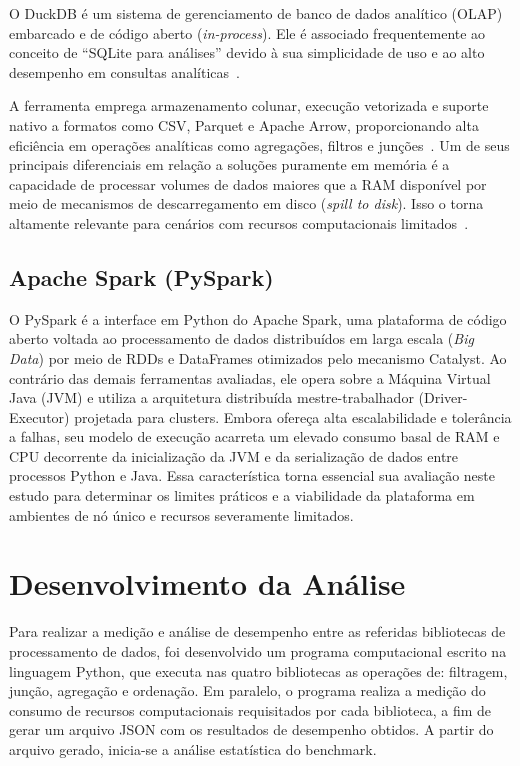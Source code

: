 \documentclass[12pt]{article}
\begin{document}
O DuckDB é um sistema de gerenciamento de banco de dados analítico (OLAP) embarcado e de código
aberto (\textit{in-process}). Ele é associado frequentemente ao conceito de ``SQLite para análises''
devido à sua simplicidade de uso e ao alto desempenho em consultas analíticas~\cite{duckdb:2026a,
duckdb:2026b}.

A ferramenta emprega armazenamento colunar, execução vetorizada e suporte nativo a formatos como
CSV, Parquet e Apache Arrow, proporcionando alta eficiência em operações analíticas como agregações,
filtros e junções~\cite{duckdb:ai2026}. Um de seus principais diferenciais em relação a soluções
puramente em memória é a capacidade de processar volumes de dados maiores que a RAM disponível por
meio de mecanismos de descarregamento em disco (\textit{spill to disk}). Isso o torna altamente
relevante para cenários com recursos computacionais limitados~\cite{duckdb:2026a}.


\subsection{Apache Spark (PySpark)}

O PySpark é a interface em Python do Apache Spark, uma plataforma de código aberto voltada ao
processamento de dados distribuídos em larga escala (\textit{Big Data}) por meio de RDDs e
DataFrames otimizados pelo mecanismo Catalyst. Ao contrário das demais ferramentas avaliadas, ele
opera sobre a Máquina Virtual Java (JVM) e utiliza a arquitetura distribuída mestre-trabalhador
(Driver-Executor) projetada para clusters.
\newpage
Embora ofereça alta escalabilidade e tolerância a falhas, seu modelo de execução acarreta um elevado
consumo basal de RAM e CPU decorrente da inicialização da JVM e da serialização de dados entre
processos Python e Java\@. Essa característica torna essencial sua avaliação neste estudo para
determinar os limites práticos e a viabilidade da plataforma em ambientes de nó único e recursos
severamente limitados.


\section{Desenvolvimento da Análise}

Para realizar a medição e análise de desempenho entre as referidas bibliotecas de processamento de
dados, foi desenvolvido um programa computacional escrito na linguagem Python, que executa nas
quatro bibliotecas as operações de: filtragem, junção, agregação e ordenação. Em paralelo, o
programa realiza a medição do consumo de recursos computacionais requisitados por cada biblioteca, a
fim de gerar um arquivo JSON com os resultados de desempenho obtidos. A partir do arquivo gerado,
inicia-se a análise estatística do benchmark.
\end{document}
